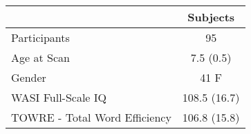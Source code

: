 \begin{tabular}{lc}
\toprule 
 &  Subjects \\ 
\midrule 
Participants & 95 \\ 
Age at Scan & 7.5 (0.5)  \\ 
Gender  &  41 F \\ 
WASI Full-Scale IQ  & 108.5 (16.7) \\ 
TOWRE - Total Word Efficiency & 106.8 (15.8) \\ 
\bottomrule 
\end{tabular}